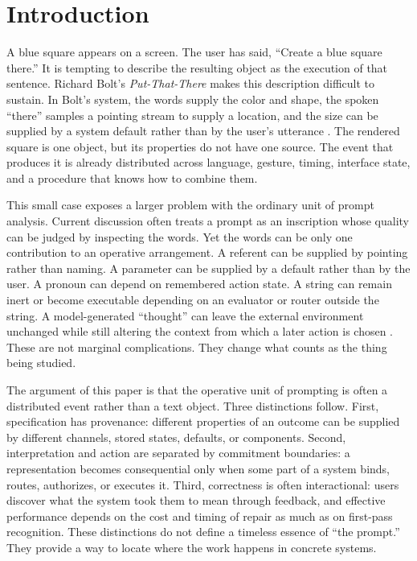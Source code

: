 \documentclass[11pt]{article}
\begin{document}
\section{Introduction}

A blue square appears on a screen. The user has said, ``Create a blue square there.'' It is tempting to describe the resulting object as the execution of that sentence. Richard Bolt's \emph{Put-That-There} makes this description difficult to sustain. In Bolt's system, the words supply the color and shape, the spoken ``there'' samples a pointing stream to supply a location, and the size can be supplied by a system default rather than by the user's utterance \citep{bolt1980put}. The rendered square is one object, but its properties do not have one source. The event that produces it is already distributed across language, gesture, timing, interface state, and a procedure that knows how to combine them.

This small case exposes a larger problem with the ordinary unit of prompt analysis. Current discussion often treats a prompt as an inscription whose quality can be judged by inspecting the words. Yet the words can be only one contribution to an operative arrangement. A referent can be supplied by pointing rather than naming. A parameter can be supplied by a default rather than by the user. A pronoun can depend on remembered action state. A string can remain inert or become executable depending on an evaluator or router outside the string. A model-generated ``thought'' can leave the external environment unchanged while still altering the context from which a later action is chosen \citep{mccarthy1960recursive,winograd1971procedures,yao2023react}. These are not marginal complications. They change what counts as the thing being studied.

The argument of this paper is that the operative unit of prompting is often a distributed event rather than a text object. Three distinctions follow. First, specification has provenance: different properties of an outcome can be supplied by different channels, stored states, defaults, or components. Second, interpretation and action are separated by commitment boundaries: a representation becomes consequential only when some part of a system binds, routes, authorizes, or executes it. Third, correctness is often interactional: users discover what the system took them to mean through feedback, and effective performance depends on the cost and timing of repair as much as on first-pass recognition. These distinctions do not define a timeless essence of ``the prompt.'' They provide a way to locate where the work happens in concrete systems.
\end{document}
